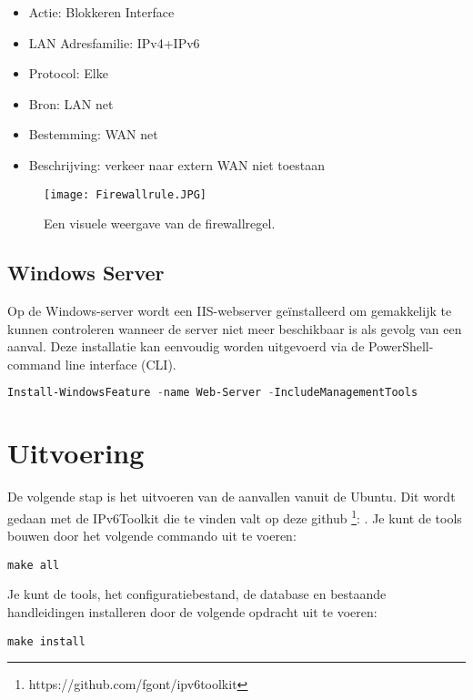 \begin{itemize}
    \item  Actie: Blokkeren Interface
    \item LAN Adresfamilie: IPv4+IPv6 
    \item Protocol: Elke 
    \item Bron: LAN net 
    \item Bestemming: WAN net 
    \item Beschrijving: verkeer naar extern WAN niet toestaan 
    
\end{itemize}

\begin{figure}[H]
    \texttt{[image: Firewallrule.JPG]}
    \caption{
        Een visuele weergave van de firewallregel. }
\end{figure}  

\subsection{Windows Server}

Op de Windows-server wordt een IIS-webserver geïnstalleerd om gemakkelijk te kunnen controleren wanneer de server niet meer beschikbaar is als gevolg van een aanval. Deze installatie kan eenvoudig worden uitgevoerd via de PowerShell-command line interface (CLI). 

\begin{lstlisting}[language=PowerShell,style=PowerShellStyle]
    Install-WindowsFeature -name Web-Server -IncludeManagementTools
\end{lstlisting}

\section{Uitvoering}
De volgende stap is het uitvoeren van de aanvallen vanuit de Ubuntu. Dit wordt gedaan met de IPv6Toolkit die te vinden valt op deze github \footnote{https://github.com/fgont/ipv6toolkit}: \newline . 
Je kunt de tools bouwen door het volgende commando uit te voeren:


\begin{lstlisting}[style=customStyleBashDark]
    make all
\end{lstlisting}
Je kunt de tools, het configuratiebestand, de database en bestaande handleidingen installeren door de volgende opdracht uit te voeren:

\begin{lstlisting}[style=customStyleBashDark]
    make install
\end{lstlisting}


